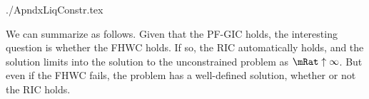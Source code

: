 \documentclass{econtex}
\begin{document}
\begin{verbatimwrite}{./ApndxLiqConstr.tex}
\begin{comment}
We can obtain a more exact approximation to the correct ${n}$ by defining
\begin{eqnarray}
\nabla(n) \equiv   \lim_{n \rightarrow \infty}\Rnorm^{n}\mathbb{C}_{t-n}^{t}-\Rnorm^{n}\mathbb{C}_{t-n}^{t} & = &  \left(\frac{\PatR^{-n}}{1-\PatR}\right).
\end{eqnarray}
from which we can obtain the difference between the approximate and the exact $\mathbb{C}_{t-n}^{t}$ as $\Rnorm^{-n}\nabla(n)$ and


For this $n$ and
$\bRat$ we can obtain the corresponding
$\cRat=\PatPGro^{-\nFunc(\bRat)}$.  Note, however, that this is {\it not}
the level of $\cRat$ directly associated with $\bRat$ on the true
consumption function, because we used only a limiting approximation to
the correct $n$ rather than the correct $n$.

Our strategy, in this case, is

The limiting difference can be obtained by realizing that
\begin{eqnarray}
\nabla(n) \equiv   \lim_{n \rightarrow \infty}\Rnorm^{n}\mathbb{C}_{t-n}^{t}-\Rnorm^{n}\mathbb{C}_{t-n}^{t} & = &  \left(\frac{\PatR^{-n}}{1-\PatR}\right).
\end{eqnarray}
and so

\end{comment}

We can summarize as follows.  Given that the PF-GIC holds, the
interesting question is whether the FHWC holds.  If so, the
RIC automatically holds, and the solution limits
into the solution to the unconstrained problem as $\mRat \uparrow
\infty$.  But even if the FHWC fails, the problem has a
well-defined solution, whether or not the RIC holds.


\end{verbatimwrite}


\end{document}
